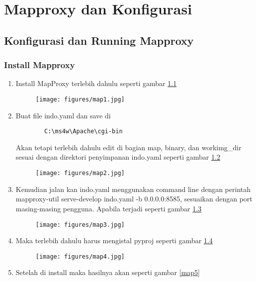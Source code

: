 \chapter{Mapproxy dan Konfigurasi}
\section{Konfigurasi dan Running Mapproxy}
\subsection{Install Mapproxy}
\begin{enumerate}
    \item Install MapProxy terlebih dahulu seperti gambar \ref{map1}
\begin{figure}[!htbp]
    \centering
    \texttt{[image: figures/map1.jpg]}
    \label{map1}
\end{figure}
    \item Buat file indo.yaml dan save di

    \begin{verbatim}
        C:\ms4w\Apache\cgi-bin
    \end{verbatim}
    Akan tetapi terlebih dahulu edit di bagian map, binary, dan workimg\_dir sesuai dengan direktori penyimpanan indo.yaml seperti gambar \ref{map2}
\begin{figure}[!htbp]
    \centering
    \texttt{[image: figures/map2.jpg]}
    \label{map2}
\end{figure}
    \item Kemudian jalan kan indo.yaml menggunakan command line dengan perintah mapproxy-util serve-develop indo.yaml -b 0.0.0.0:8585, sesuaikan dengan port masing-masing pengguna. Apabila terjadi seperti gambar \ref{map3}

\begin{figure}[!htbp]
    \centering
    \texttt{[image: figures/map3.jpg]}
    \label{map3}
\end{figure}
    \item Maka terlebih dahulu harus mengistal pyproj seperti gambar \ref{map4}
\begin{figure}[!htbp]
    \centering
    \texttt{[image: figures/map4.jpg]}
    \label{map4}
\end{figure}
    \item Setelah di install maka hasilnya akan seperti gambar \ref{map5}

\end{enumerate}
